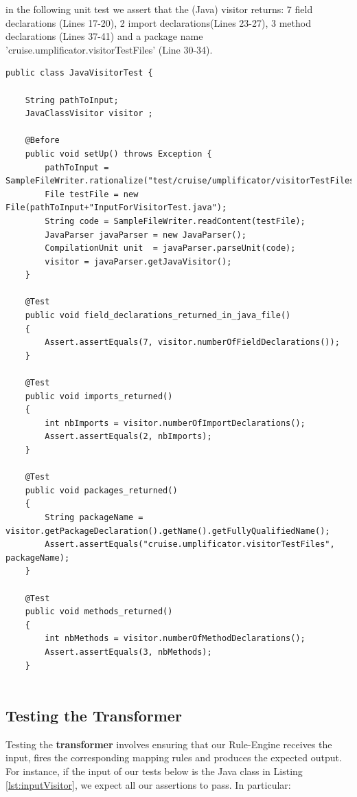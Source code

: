 in the following unit test we assert that the (Java) visitor returns: 7 field declarations (Lines 17-20), 2 import declarations(Lines 23-27), 3 method declarations (Lines 37-41) and a package name 'cruise.umplificator.visitorTestFiles' (Line 30-34).

\begin{lstlisting}[style=java]
public class JavaVisitorTest {

	String pathToInput;
	JavaClassVisitor visitor ;
	
	@Before
	public void setUp() throws Exception {
		pathToInput = SampleFileWriter.rationalize("test/cruise/umplificator/visitorTestFiles/");
		File testFile = new File(pathToInput+"InputForVisitorTest.java");
		String code = SampleFileWriter.readContent(testFile);
		JavaParser javaParser = new JavaParser();
		CompilationUnit unit  = javaParser.parseUnit(code);
		visitor = javaParser.getJavaVisitor();
	}
	
	@Test
	public void field_declarations_returned_in_java_file()
	{
		Assert.assertEquals(7, visitor.numberOfFieldDeclarations());
	}
		
	@Test
	public void imports_returned()
	{
		int nbImports = visitor.numberOfImportDeclarations();
		Assert.assertEquals(2, nbImports);
	}
	
	@Test
	public void packages_returned()
	{
	    String packageName = visitor.getPackageDeclaration().getName().getFullyQualifiedName();
		Assert.assertEquals("cruise.umplificator.visitorTestFiles", packageName);
	}

	@Test
	public void methods_returned()
	{
		int nbMethods = visitor.numberOfMethodDeclarations();
		Assert.assertEquals(3, nbMethods);
	}
	
\end{lstlisting}

\subsection{Testing the Transformer}

Testing the \textbf{transformer} involves ensuring that our Rule-Engine receives the input, fires the corresponding mapping rules and produces the expected output.
For instance, if the input of our tests below is the Java class in Listing \ref{lst:inputVisitor}, we expect all our assertions to pass. In particular:


